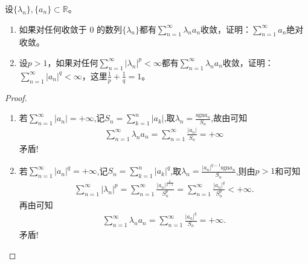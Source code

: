 \documentclass[../../main.tex]{subfiles}
\begin{document}
\begin{example}
设$\{ \lambda_n \},\{ a_n \} \subset \mathbb{R}$。
\begin{enumerate}
\item 如果对任何收敛于 0 的数列$\{ \lambda_n \}$都有$\sum_{n=1}^{\infty} \lambda_n a_n$收敛，证明：$\sum_{n=1}^{\infty} a_n$绝对收敛。

\item 设$p > 1$，如果对任何$\sum_{n=1}^{\infty} |\lambda_n|^p < \infty$都有$\sum_{n=1}^{\infty} \lambda_n a_n$收敛，证明：$\sum_{n=1}^{\infty} |a_n|^q < \infty$，这里$\frac{1}{p} + \frac{1}{q} = 1$。
\end{enumerate}
\end{example}
\begin{proof}
\begin{enumerate}
\item 若$\sum_{n=1}^{\infty}{| a_n |}=+\infty$,记$S_n=\sum_{k=1}^n{| a_k |}$,取$\lambda _n=\frac{\mathrm{sgn} a_n}{S_n}$,故由可知
\begin{align*}
\sum_{n=1}^{\infty}{\lambda _na_n}=\sum_{n=1}^{\infty}{\frac{| a_n |}{S_n}}=+\infty
\end{align*}
矛盾!

\item 若$\sum_{n=1}^{\infty}{| a_n |^q}=+\infty$,记$S_n=\sum_{k=1}^n{| a_k |^q}$,取$\lambda _n=\frac{| a_n |^{q-1}\mathrm{sgn} a_n}{S_n}$,则由$p>1$和可知
\begin{align*}
\sum_{n=1}^{\infty}{| \lambda _n |^p}=\sum_{n=1}^{\infty}{\frac{| a_n |^{\frac{p}{p-1}}}{S_{n}^{p}}}=\sum_{n=1}^{\infty}{\frac{| a_n |^q}{S_{n}^{p}}}<+\infty.
\end{align*}
再由可知
\begin{align*}
\sum_{n=1}^{\infty}{\lambda _na_n}=\sum_{n=1}^{\infty}{\frac{| a_n |^q}{S_n}}=+\infty.
\end{align*}
矛盾!
\end{enumerate}
\end{proof}
\end{document}
